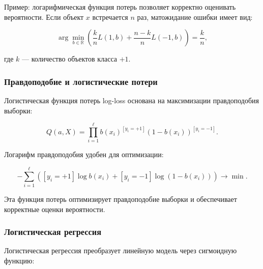 Пример: логарифмическая функция потерь позволяет корректно оценивать
вероятности. Если объект \(x \) встречается \( n \) раз, матожидание
ошибки имеет вид:

\begin{equation}
\arg\min_{b \in \mathbb{R}} \left( \frac{k}{n} L(1, b) + \frac{n-k}{n} L(-1, b) \right) = \frac{k}{n},
\end{equation}

где \( k \) --- количество объектов класса \( +1 \).

\hypertarget{ux43fux440ux430ux432ux434ux43eux43fux43eux434ux43eux431ux438ux435-ux438-ux43bux43eux433ux438ux441ux442ux438ux447ux435ux441ux43aux438ux435-ux43fux43eux442ux435ux440ux438}{%
\subsubsection*{Правдоподобие и логистические
потери}\label{ux43fux440ux430ux432ux434ux43eux43fux43eux434ux43eux431ux438ux435-ux438-ux43bux43eux433ux438ux441ux442ux438ux447ux435ux441ux43aux438ux435-ux43fux43eux442ux435ux440ux438}}

Логистическая функция потерь log-loss основана на
максимизации правдоподобия выборки:

\begin{equation}
Q(a, X) = \prod_{i=1}^\ell b(x_i)^{[y_i=+1]} (1 - b(x_i))^{[y_i=-1]}.
\end{equation}

Логарифм правдоподобия удобен для оптимизации:

\begin{equation}
-\sum_{i=1}^\ell \left( [y_i = +1] \log b(x_i) + [y_i = -1] \log(1 - b(x_i)) \right) \to \min.
\end{equation}

Эта функция потерь оптимизирует правдоподобие выборки и обеспечивает
корректные оценки вероятности.

\hypertarget{ux43bux43eux433ux438ux441ux442ux438ux447ux435ux441ux43aux430ux44f-ux440ux435ux433ux440ux435ux441ux441ux438ux44f-1}{%
\subsubsection*{Логистическая
регрессия}\label{ux43bux43eux433ux438ux441ux442ux438ux447ux435ux441ux43aux430ux44f-ux440ux435ux433ux440ux435ux441ux441ux438ux44f-1}}

Логистическая регрессия преобразует линейную модель через сигмоидную
функцию:

